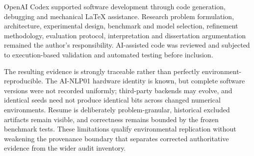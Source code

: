 OpenAI Codex supported software development through code generation, debugging and mechanical LaTeX assistance. Research problem formulation, architecture, experimental design, benchmark and model selection, refinement methodology, evaluation protocol, interpretation and dissertation argumentation remained the author's responsibility. AI-assisted code was reviewed and subjected to execution-based validation and automated testing before inclusion.

The resulting evidence is strongly traceable rather than perfectly environment-reproducible. The AI-NLP01 hardware identity is known, but complete software versions were not recorded uniformly; third-party backends may evolve, and identical seeds need not produce identical bits across changed numerical environments. Resume is deliberately problem-granular, historical excluded artifacts remain visible, and correctness remains bounded by the frozen benchmark tests. These limitations qualify environmental replication without weakening the provenance boundary that separates corrected authoritative evidence from the wider audit inventory.
